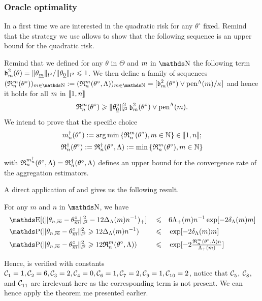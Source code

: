 \subsubsection{Oracle optimality}
In a first time we are interested in the quadratic risk for any $\theta^{\circ}$ fixed.
Remind that the strategy we use allows to show that the following sequence is an upper bound for the quadratic risk.
\begin{de*}
Remind that we defined for any $\theta$ in $\Theta$ and $\Di$ in $\N$ the following term $\b_{m}^{2}(\theta) = \Vert \theta_{\underline{m}} \Vert_{l^{2}}/\Vert \theta_{\underline{0}} \Vert_{l^{2}} \leq 1$.
We then define a family of sequences $(\daRa{\Di}{(\xdf)})_{\Di \in \N} := (\daRa{\Di}{(\xdf,\Lambda)})_{\Di \in \N} = [\b_{m}^{2}(\theta^{\circ}) \vee \penSv/\cpen]$ and hence it holds for all $\Di$ in $\nset{1,\ssY}$
    \begin{equation}
      [\Vnormlp{\xdf_{\underline{0}}}^2+\cpen]\daRa{\Di}{(\xdf)}\geq\Vnormlp{\xdf_{\underline{0}}}^2\bias^2(\xdf)\vee\penSv.
      \end{equation}
We intend to prove that the specific choice
\begin{multline*}
\aDi{\ssY}(\xdf):=\argmin\Nset[\Di\in\Nz]{\daRa{\Di}{(\xdf)}}\in\nset{1,\ssY}; \\
\naRa{(\xdf)}:=\naRa{(\xdf,\Lambda)}:=\min\Nset[\Di\in\Nz]{\daRa{\Di}{(\xdf)}}
\end{multline*}
with $\daRa{\aDi{\ssY}}{(\xdf,\Lambda)}=\naRa{(\xdf,\Lambda)}$ defines an upper bound for the convergence rate of the aggregation estimators.
\assEnd
\end{de*}

A direct application of  and  gives us the following result.
\begin{cor*}
For any $m$ and $n$ in $\N$, we have
\begin{alignat*}{3}
& \E[(\Vert \theta_{n, \overline{m}} - \theta^{\circ}_{\overline{m}} \Vert_{l^{2}}^{2} - 12 \Delta_{\Lambda}(m) n ^{-1})_{+}]&& \leq && 6 \Lambda_{+}(m) n^{-1} \exp[-2 \delta_{\Lambda}(m) m]\\
& \P(\Vert \theta_{n, \overline{m}} - \theta^{\circ}_{\overline{m}} \Vert_{l^{2}}^{2} \geq 12 \Delta_{\Lambda}(m) n ^{-1})&& \leq &&\exp[-2 \delta_{\Lambda}(m) m]\\
& \P(\Vert \theta_{n, \overline{m}} - \theta^{\circ}_{\overline{m}} \Vert_{l^{2}}^{2} \geq 12 \mathfrak{R}_{n}^{m}(\theta^{\circ}, \Lambda))&& \leq &&\exp[-2 \tfrac{\mathfrak{R}_{n}^{m}(\theta^{\circ}, \Lambda) n}{\Lambda_{+}(m)}]
\end{alignat*}
\reEnd
\end{cor*}
Hence,  is verified with constants $\cst{1} = 1, \cst{2} = 6, \cst{3} = 2, \cst{4} = 0, \cst{6} = 1, \cst{7} = 2, \cst{9} = 1, \cst{10} = 2$, notice that $\cst{5}$, $\cst{8}$, and $\cst{11}$ are irrelevant here as the corresponding term is not present.
We can hence apply the theorem me presented earlier.

